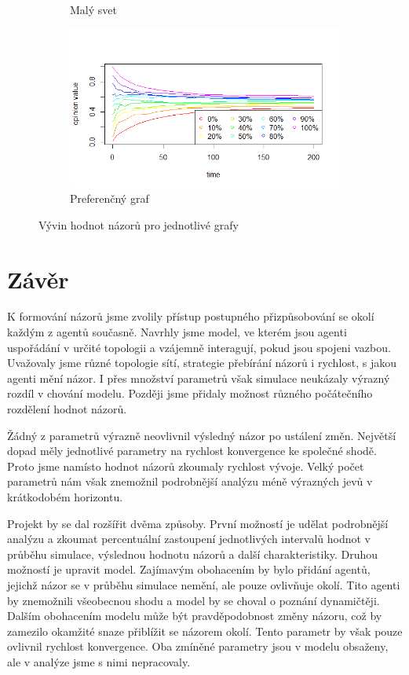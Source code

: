 \documentclass[10pt,a4paper]{report}
\begin{document}
\begin{figure}[h]
\begin{subfigure}[b]{0.475\textwidth}
      \caption[]%
      {{\small Malý svet}}    
      \label{fig:prubeh-maly svet}
  \end{subfigure}
  \quad
  \begin{subfigure}[b]{0.475\textwidth}   
      \centering 
      \includegraphics[width=\textwidth]{plots/max-values/prefferentialMaxV.png}
      \caption[]%
      {{\small Preferenčný graf}}    
      \label{fig:prubeh-preferencni}
  \end{subfigure}
  \caption[]
  {\small Vývin hodnot názorů pro jednotlivé grafy}
  \label{fig:prubeh-grafy}
\end{figure}
 
\chapter{Závěr}
K formování názorů jsme zvolily přístup postupného přizpůsobování se okolí každým z agentů současně. Navrhly jsme model, ve kterém jsou agenti uspořádání v určité topologii a vzájemně interagují, pokud jsou spojeni vazbou. Uvažovaly jsme různé topologie sítí, strategie přebírání názorů i rychlost, s jakou agenti mění názor. I přes množství parametrů však simulace neukázaly výrazný rozdíl v chování modelu. Později jsme přidaly možnost různého počátečního rozdělení hodnot názorů.

Žádný z parametrů výrazně neovlivnil výsledný názor po ustálení změn. Největší dopad měly jednotlivé parametry na rychlost konvergence ke společné shodě. Proto jsme namísto hodnot názorů zkoumaly rychlost vývoje. Velký počet parametrů nám však znemožnil podrobnější analýzu méně výrazných jevů v krátkodobém horizontu.

Projekt by se dal rozšířit dvěma způsoby. První možností je udělat podrobnější analýzu a zkoumat percentuální zastoupení jednotlivých intervalů hodnot v průběhu simulace, výslednou hodnotu názorů a další charakteristiky. Druhou možností je upravit model. Zajímavým obohacením by bylo přidání agentů, jejichž názor se v průběhu simulace nemění, ale pouze ovlivňuje okolí. Tito agenti by znemožnili všeobecnou shodu a model by se choval o poznání dynamičtěji. Dalším obohacením modelu může být pravděpodobnost změny názoru, což by zamezilo okamžité snaze přiblížit se názorem okolí. Tento parametr by však pouze ovlivnil rychlost konvergence. Oba zmíněné parametry jsou v modelu obsaženy, ale v analýze jsme s nimi nepracovaly.
\end{document}
